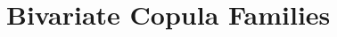 \documentclass[12pt,oneside,a4paper]{book}
\theoremstyle{definition}
\theoremstyle{remark}
\DeclareMathOperator*{\argmax}{argmax}
\begin{document}
	\chapter{Bivariate Copula Families}
	\label{app:copulas}
\end{document}
